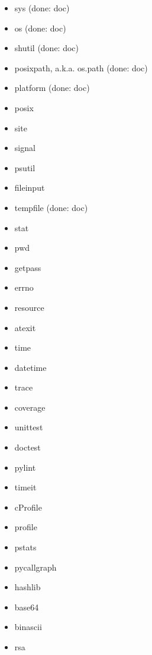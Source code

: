 \documentclass{article}
\begin{document}
\begin{enumerate}
\begin{itemize}
            \item sys (done: doc)
            \item os (done: doc)
            \item shutil (done: doc)
            \item posixpath, a.k.a. os.path (done: doc)
            \item platform (done: doc)
            \item posix
            \item site
            \item signal
            \item psutil
            \item fileinput
            \item tempfile (done: doc)
            \item stat
            \item pwd
            \item getpass
            \item errno
            \item resource
            \item atexit

            \item time
            \item datetime

            \item trace
            \item coverage
            \item unittest
            \item doctest

            \item pylint

            \item timeit
            \item cProfile
            \item profile
            \item pstats
            \item pycallgraph

            \item hashlib
            \item base64
            \item binascii
            \item rsa


\end{itemize}
\end{enumerate}
\end{document}

